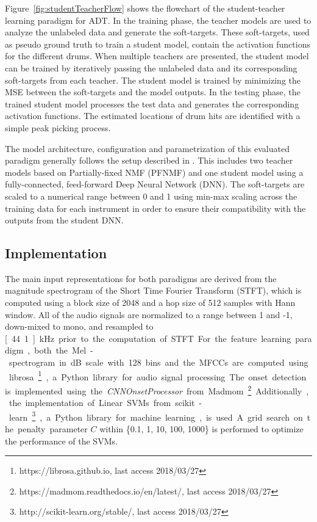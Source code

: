 \documentclass{article}
\newcommand{\comment}[1]{{\textcolor{blue}{#1}}}
\begin{document}
Figure~\ref{fig:studentTeacherFlow} shows the flowchart of the student-teacher learning paradigm for ADT. In the training phase, the teacher models are used to analyze the unlabeled data and generate the soft-targets. These soft-targets, used as pseudo ground truth to train a student model, contain the activation functions for the different drums. 
When multiple teachers are presented, the student model can be trained by iteratively passing the unlabeled data and its corresponding soft-targets from each teacher. The student model is trained by minimizing the MSE between the soft-targets and the model outputs. 
In the testing phase, the trained student model processes the test data and generates the corresponding activation functions. The estimated locations of drum hits are identified with a simple peak picking process. 

The model architecture, configuration and parametrization of this evaluated paradigm generally follows the setup described in \cite{Wu2017}. This includes two teacher models based on Partially-fixed NMF (PFNMF) \cite{Wu2015_ismir} and one student model using a fully-connected, feed-forward Deep Neural Network (DNN). The soft-targets are scaled to a numerical range between 0 and 1 using min-max scaling across the training data for each instrument in order to ensure their compatibility with the outputs from the student DNN. 
\subsection{Implementation}
The main input representations for both paradigms are derived from the magnitude spectrogram of the Short Time Fourier Transform (STFT), which is computed using a block size of 2048 and a hop size of 512 samples with Hann window. All of the audio signals are normalized to a range between 1 and -1, down-mixed to mono, and resampled to \unit[44.1]{kHz} prior to the computation of STFT. %

For the feature learning paradigm, both the Mel-spectrogram in dB scale with 128 bins and the MFCCs are computed using librosa\footnote{https://librosa.github.io, last access 2018/03/27}, a Python library for audio signal processing. The onset detection is implemented using the \textit{CNNOnsetProcessor} from Madmom\footnote{https://madmom.readthedocs.io/en/latest/, last access 2018/03/27}. Additionally, the implementation of Linear SVMs from scikit-learn\footnote{http://scikit-learn.org/stable/, last access 2018/03/27}, a Python library for machine learning, is used. A grid search on the penalty parameter $C$ within \{0.1, 1, 10, 100, 1000\} is performed to optimize the performance of the SVMs. 
\end{document}
